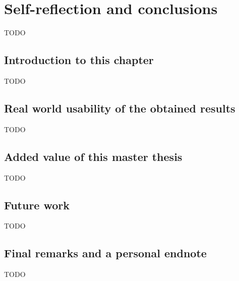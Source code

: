 



\chapter{Self-reflection and conclusions}
\label{ch:discussion}
TODO

\section{Introduction to this chapter}
\label{sec:discussion_introduction}

TODO

\section{Real world usability of the obtained results}
\label{sec:discussion_real_world_use}

TODO

\section{Added value of this master thesis}
\label{sec:discussion_added_value}

TODO

\section{Future work}
\label{sec:discussion_future_work}

TODO

\section{Final remarks and a personal endnote}
\label{sec:discussion_final_remarks}

TODO
